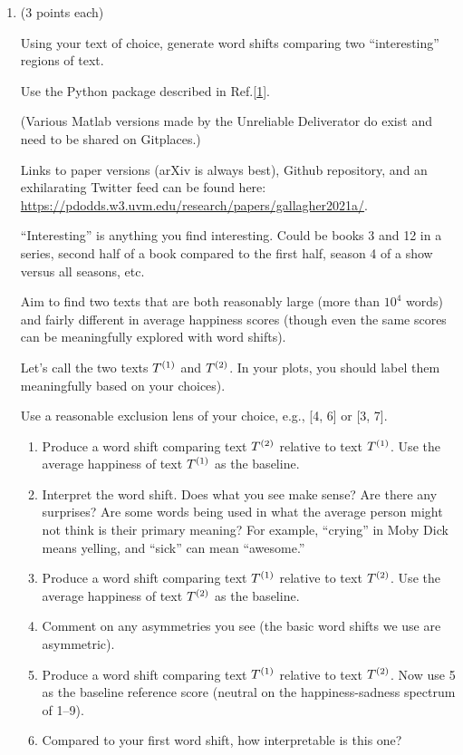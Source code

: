 \begin{enumerate}

\item (3 points each)

  Using your text of choice, generate word shifts comparing two ``interesting'' regions of text.

  Use the Python package described in Ref.[\href{https://arxiv.org/abs/2008.02250}{1}].

  (Various Matlab versions made by the Unreliable Deliverator do exist and need to be shared on Gitplaces.)

  Links to paper versions (arXiv is always best),
  Github repository,
  and an
  exhilarating Twitter feed
  can be found here: \url{https://pdodds.w3.uvm.edu/research/papers/gallagher2021a/}.

  ``Interesting'' is anything you find interesting.  Could be books 3 and 12 in a series,
  second half of a book compared to the first half, season 4 of a show versus all seasons, etc.

  Aim to find two texts that are both reasonably large (more than $10^{4}$ words)
  and fairly different in average happiness scores (though even the same scores can be
  meaningfully explored with word shifts).
  
  Let's call the two texts
  $T^{(1)}$
  and
  $T^{(2)}$.
  In your plots, you should label them meaningfully based on your choices).

  Use a reasonable exclusion lens of your choice, e.g., [4, 6] or [3, 7].

  \begin{enumerate} 
  \item 
    Produce a word shift comparing text $T^{(2)}$ relative to text $T^{(1)}$.
    Use the average happiness of text $T^{(1)}$ as the baseline.
  \item 
    Interpret the word shift. Does what you see make sense?
    Are there any surprises?
    Are some words being used in what the average person might not think is their primary meaning?
    For example, ``crying'' in Moby Dick means yelling, and ``sick'' can mean ``awesome.''
  \item
    Produce a word shift comparing text $T^{(1)}$ relative to text $T^{(2)}$.
    Use the average happiness of text $T^{(2)}$ as the baseline.
  \item
    Comment on any asymmetries you see (the basic word shifts we use are asymmetric).
  \item
    Produce a word shift comparing text $T^{(1)}$ relative to text $T^{(2)}$.
    Now use 5 as the baseline reference score (neutral on the happiness-sadness spectrum of 1--9).
  \item
    Compared to your first word shift, how interpretable is this one?
  \end{enumerate}
\clearpage
  

\end{enumerate}
